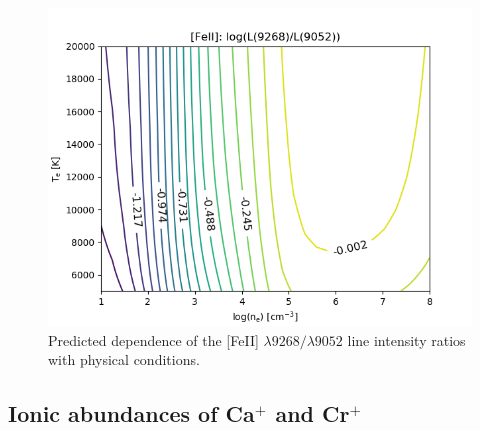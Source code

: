 \documentclass[twocolumn]{aastex63}
\begin{document}
\begin{figure}
\centering
\includegraphics[width=\columnwidth]{9268_9052.png}
\caption{Predicted dependence of the [Fe\thinspace II] $\lambda9268/\lambda9052$ line intensity ratios with physical conditions.}
\label{fig:fe2_density}
\end{figure}


\subsection{Ionic abundances of Ca$^{+}$ and Cr$^{+}$}
\label{subsec:ionic_abundances_rare}
\end{document}
